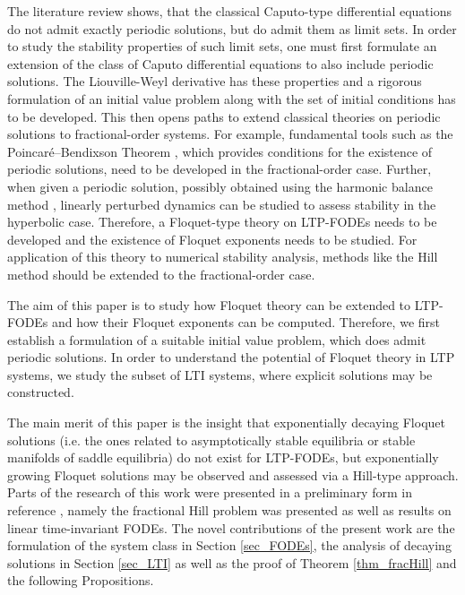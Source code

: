 \documentclass{svproc}
\begin{document}
{         The literature review shows, that the classical Caputo-type differential equations do not admit exactly periodic solutions, but do admit them as limit sets. In order to study the stability properties of such limit sets, one must first formulate an extension of the class of Caputo differential equations to also include periodic solutions. The Liouville-Weyl derivative has these properties and a rigorous formulation of an initial value problem along with the set of initial conditions has to be developed. This then opens paths to extend classical theories on periodic solutions to fractional-order systems. For example, fundamental tools such as the Poincaré--Bendixson Theorem \cite{HirschEtAl2013}, which provides conditions for the existence of periodic solutions, need to be developed in the fractional-order case. Further, when given a periodic solution, possibly obtained using the harmonic balance method \cite{Rand2010,Daibiri2015,Shahroudi2024}, linearly perturbed dynamics can be studied to assess stability in the  hyperbolic case. Therefore, a Floquet-type theory on LTP-FODEs needs to be developed and the existence of Floquet exponents needs to be studied. For application of this theory to numerical stability analysis, methods like the Hill method should be extended to the fractional-order case.
        
		The aim of this paper is to study how Floquet theory can be extended to LTP-FODEs and how their Floquet exponents can be computed. Therefore, we first establish a formulation of a suitable initial value problem, which does admit periodic solutions. In order to understand the potential of Floquet theory in LTP systems, we study the subset of LTI systems, where explicit solutions may be constructed. 
        
        The main merit of this paper is the insight that exponentially decaying Floquet solutions (i.e. the ones related to asymptotically stable equilibria or stable manifolds of saddle equilibria) do not exist for LTP-FODEs, but exponentially growing Floquet solutions may be observed and assessed via a Hill-type approach. Parts of the research of this work were presented in a preliminary form {in reference} \cite{Haacker2025}, namely the fractional Hill problem was presented as well as results on linear time-invariant FODEs. The novel contributions of the present work are the formulation of the system class in Section \ref{sec_FODEs}, the analysis of decaying solutions in Section \ref{sec_LTI} as well as the proof of Theorem \ref{thm_fracHill} and the following Propositions.
	}
	
\end{document}
